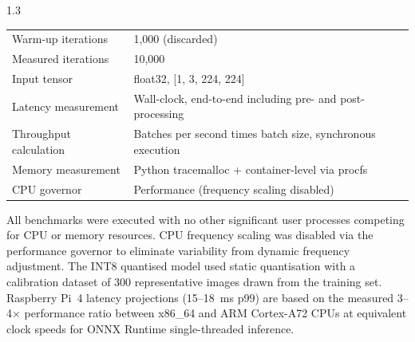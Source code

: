 \begin{spacing}{1.3}
\begin{table}[H]
\begin{tabular}{ll}
\midrule
Warm-up iterations      & 1,000 (discarded) \\
Measured iterations     & 10,000 \\
Input tensor            & float32, [1, 3, 224, 224] \\
Latency measurement     & Wall-clock, end-to-end including pre- and post-processing \\
Throughput calculation  & Batches per second times batch size, synchronous execution \\
Memory measurement      & Python tracemalloc + container-level via procfs \\
CPU governor            & Performance (frequency scaling disabled) \\
\bottomrule
\end{tabular}
\end{table}

All benchmarks were executed with no other significant user processes competing for CPU or memory resources. CPU frequency scaling was disabled via the performance governor to eliminate variability from dynamic frequency adjustment. The INT8 quantised model used static quantisation with a calibration dataset of 300 representative images drawn from the training set. Raspberry Pi~4 latency projections (15--18~ms p99) are based on the measured 3--4$\times$ performance ratio between x86\_64 and ARM Cortex-A72 CPUs at equivalent clock speeds for ONNX Runtime single-threaded inference.

\end{spacing}
